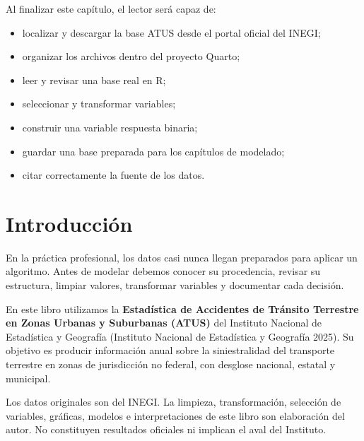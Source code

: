 \documentclass[
  spanish,
  10.5pt,
  letterpaper,
  openany,
  headings=big]{scrbook}
\providecommand{\tightlist}{%
  \setlength{\itemsep}{0pt}\setlength{\parskip}{0pt}}
\begin{document}
Al finalizar este capítulo, el lector será capaz de:

\begin{itemize}
\tightlist
\item
  localizar y descargar la base ATUS desde el portal oficial del INEGI;
\item
  organizar los archivos dentro del proyecto Quarto;
\item
  leer y revisar una base real en R;
\item
  seleccionar y transformar variables;
\item
  construir una variable respuesta binaria;
\item
  guardar una base preparada para los capítulos de modelado;
\item
  citar correctamente la fuente de los datos.
\end{itemize}

\section{Introducción}\label{introducciuxf3n-1}

En la práctica profesional, los datos casi nunca llegan preparados para
aplicar un algoritmo. Antes de modelar debemos conocer su procedencia,
revisar su estructura, limpiar valores, transformar variables y
documentar cada decisión.

En este libro utilizamos la \textbf{Estadística de Accidentes de
Tránsito Terrestre en Zonas Urbanas y Suburbanas (ATUS)} del Instituto
Nacional de Estadística y Geografía (Instituto Nacional de Estadística y
Geografía 2025). Su objetivo es producir información anual sobre la
siniestralidad del transporte terrestre en zonas de jurisdicción no
federal, con desglose nacional, estatal y municipal.

\begin{tcolorbox}[enhanced jigsaw, arc=.35mm, bottomrule=.15mm, bottomtitle=1mm, breakable, colback=white, colbacktitle=quarto-callout-important-color!10!white, colframe=quarto-callout-important-color-frame, coltitle=black, left=2mm, leftrule=.75mm, opacityback=0, opacitybacktitle=0.6, rightrule=.15mm, title=\textcolor{quarto-callout-important-color}{\faExclamation}\hspace{0.5em}{Uso responsable de la información}, titlerule=0mm, toprule=.15mm, toptitle=1mm]

Los datos originales son del INEGI. La limpieza, transformación,
selección de variables, gráficas, modelos e interpretaciones de este
libro son elaboración del autor. No constituyen resultados oficiales ni
implican el aval del Instituto.

\end{tcolorbox}
\end{document}
